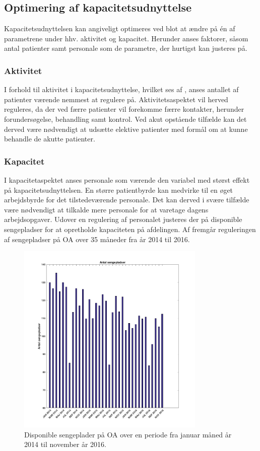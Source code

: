 \subsection{Optimering af kapacitetsudnyttelse}
Kapacitetsudnyttelsen kan angiveligt optimeres ved blot at ændre på én af parametrene under hhv. aktivitet og kapacitet. Herunder anses faktorer, såsom antal patienter samt personale som de parametre, der hurtigst kan justeres på. 

\subsubsection{Aktivitet}
I forhold til aktivitet i kapacitetsudnyttelse, hvilket ses af , anses antallet af patienter værende nemmest at regulere på. Aktivitetsaspektet vil herved reguleres, da der ved færre patienter vil forekomme færre kontakter, herunder forundersøgelse, behandling
samt kontrol. Ved akut opstående tilfælde kan det derved være nødvendigt at udsætte elektive patienter med formål om at kunne behandle de akutte patienter. 


\subsubsection{Kapacitet}
I kapacitetaspektet anses personale som værende den variabel med størst effekt på kapacitetsudnyttelsen. En større patientbyrde kan medvirke til en øget arbejdsbyrde for det tilstedeværende personale. Det kan derved i svære tilfælde være nødvendigt at tilkalde mere personale for at varetage dagens arbejdsopgaver. 
Udover en regulering af personalet justeres der på disponible sengepladser for at opretholde kapaciteten på afdelingen. Af  fremgår reguleringen af sengepladser på OA over 35 måneder fra år 2014 til 2016.

\begin{figure}[H] 
\begin{center}
\includegraphics[width=0.8\textwidth]{figures/sengepladser}
\end{center}
\caption{Disponible sengeplader på OA over en periode fra januar måned år 2014 til november år 2016.} 
\label{fig:sengepladser} 
\end{figure}

